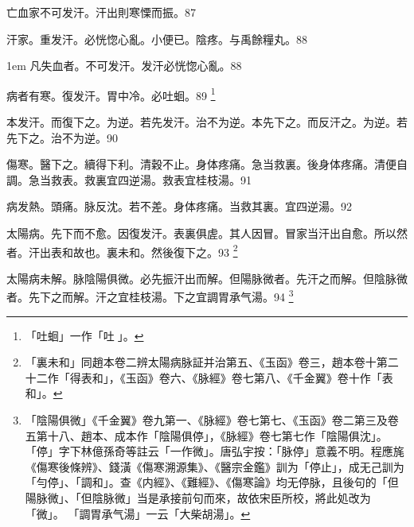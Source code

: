亡血家不可发汗。汗出則寒慄而振。87

汗家。重发汗。必恍惚心亂。小便已。陰疼。与禹餘糧丸。88

\hangindent 1em
凡失血者。不可发汗。发汗必恍惚心亂。{\gaoben}88

病者有寒。復发汗。胃中冷。必吐蛔。89
	\footnote{
		「吐蛔」一作「吐{\sungtpii 𠱘}」。
	}

本发汗。而復下之。为逆。若先发汗。治不为逆。本先下之。而反汗之。为逆。若先下之。治不为逆。90

傷寒。醫下之。續得下利。清穀不止。身体疼痛。急当救裏。後身体疼痛。清便自調。急当救表。救裏宜四逆湯。救表宜桂枝湯。91

病发熱。頭痛。脉反沈。若不差。身体疼痛。当救其裏。宜四逆湯。92

太陽病。先下而不愈。因復发汗。表裏俱虗。其人因冒。冒家当汗出自愈。所以然者。汗出表和故也。裏未和。然後{\khaaitp 復}下之。93
	\footnote{
		「裏未和」同趙本卷二辨太陽病脉証并治第五、《玉函》卷三，趙本卷十第二十二作「得表和」，《玉函》卷六、《脉經》卷七第八、《千金翼》卷十作「表和」。
	}

太陽病未解。脉陰陽俱微。必先振汗出而解。但陽{\khaaitp 脉}微者。先汗之而解。但陰{\khaaitp 脉}微者。先下之而解。汗之宜桂枝湯。下之宜{\khaaitp 調胃}承气湯。94
	\footnote{
		「陰陽俱微」《千金翼》卷九第一、《脉經》卷七第七、《玉函》卷二第三及卷五第十八、趙本、成本作「陰陽俱停」，《脉經》卷七第七作「陰陽俱沈」。
		「停」字下林億孫奇等註云「一作微」。唐弘宇按：「脉停」意義不明。程應旄《傷寒後條辨》、錢潢《傷寒溯源集》、《醫宗金鑑》訓为「停止」，成无己訓为「勻停」、「調和」。查《内經》、《難經》、《傷寒論》均无停脉，且後句的「但陽脉微」、「但陰脉微」当是承接前句而來，故依宋臣所校，將此処改为「微」。
		「調胃承气湯」一云「大柴胡湯」。
	}

